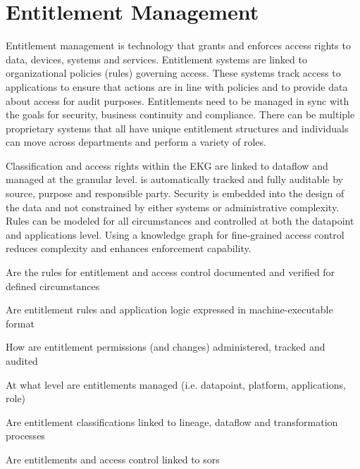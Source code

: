 \section{Entitlement Management}\label{sec:ekgmm-b-4-4} %

Entitlement management is technology that grants and enforces access rights to data, devices, systems and services.
Entitlement systems are linked to organizational policies (rules) governing access.
These systems track access to applications to ensure that actions are in line with policies and to provide data
about access for audit purposes.
Entitlements need to be managed in sync with the goals for security, business continuity and compliance.
There can be multiple proprietary systems that all have unique entitlement structures and
individuals can move across departments and perform a variety of roles.

\kgmmekgrationalesection

Classification and access rights within the EKG are linked to dataflow and managed at the granular level.
 is automatically tracked and fully auditable by source, purpose and responsible party.
Security is embedded into the design of the data and not constrained by either systems or administrative complexity.
Rules can be modeled for all circumstances and controlled at both the datapoint and applications level.
Using a knowledge graph for fine-grained access control reduces complexity and enhances enforcement capability.

\kgmmcorequestionssection

\begin{core-questions}

  \item [\thesection.1] Are the rules for entitlement and access control documented and verified for defined circumstances
  \item [\thesection.2] Are entitlement rules and application logic expressed in machine-executable format
  \item [\thesection.3] How are entitlement permissions (and changes) administered, tracked and audited
  \item [\thesection.4] At what level are entitlements managed (i.e. datapoint, platform, applications, role)
  \item [\thesection.5] Are entitlement classifications linked to lineage, dataflow and transformation processes
  \item [\thesection.6] Are entitlements and access control linked to \glspl{sor}

\end{core-questions}

